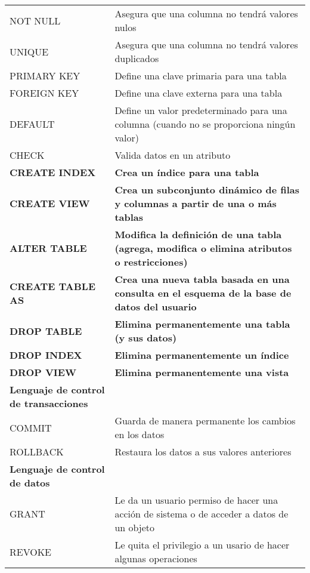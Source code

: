 \begin{longtable}[l]{ l p{7cm} }
    \qquad NOT NULL & Asegura que una columna no tendrá valores nulos\\
    \qquad UNIQUE & Asegura que una columna no tendrá valores duplicados\\
    \qquad PRIMARY KEY & Define una clave primaria para una tabla\\
    \qquad FOREIGN KEY & Define una clave externa para una tabla\\
    \qquad DEFAULT & Define un valor predeterminado para una columna (cuando no se proporciona ningún valor)\\
    \qquad CHECK & Valida datos en un atributo\\
    \textbf{CREATE INDEX} & \textbf{Crea un índice para una tabla}\\
    \textbf{CREATE VIEW} & \textbf{Crea un subconjunto dinámico de filas y columnas a partir de una o más tablas}\\
    \textbf{ALTER TABLE} & \textbf{Modifica la definición de una tabla (agrega, modifica o elimina atributos o restricciones)}\\
    \textbf{CREATE TABLE AS} & \textbf{Crea una nueva tabla basada en una consulta en el esquema de la base de datos del usuario}\\
    \textbf{DROP TABLE} & \textbf{Elimina permanentemente una tabla (y sus datos)}\\
    \textbf{DROP INDEX} & \textbf{Elimina permanentemente un índice}\\
    \textbf{DROP VIEW} & \textbf{Elimina permanentemente una vista}\\
    \textbf{Lenguaje de control de transacciones}\\
    \qquad COMMIT & Guarda de manera permanente los cambios en los datos\\
    \qquad ROLLBACK & Restaura los datos a sus valores anteriores\\
    \textbf{Lenguaje de control de datos}\\
    \qquad GRANT & Le da un usuario permiso de hacer una acción de sistema o de acceder a datos de un objeto\\
    \qquad REVOKE & Le quita el privilegio a un usario de hacer algunas operaciones\\
\end{longtable}